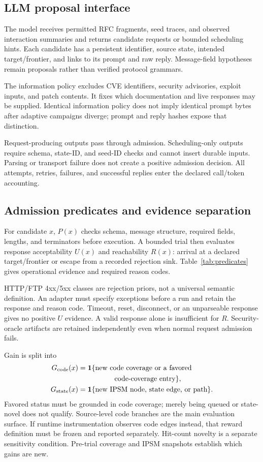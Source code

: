 \documentclass[final,5p,times,number]{elsarticle}
\newcommand{\gcode}{G_{\mathrm{code}}}
\newcommand{\gstate}{G_{\mathrm{state}}}
\begin{document}
\subsection{LLM proposal interface}
The model receives permitted RFC fragments, seed traces, and observed interaction summaries and returns candidate requests or bounded scheduling hints. Each candidate has a persistent identifier, source state, intended target/frontier, and links to its prompt and raw reply. Message-field hypotheses remain proposals rather than verified protocol grammars.

The information policy excludes CVE identifiers, security advisories, exploit inputs, and patch contents. It fixes which documentation and live responses may be supplied. Identical information policy does not imply identical prompt bytes after adaptive campaigns diverge; prompt and reply hashes expose that distinction.

Request-producing outputs pass through admission. Scheduling-only outputs require schema, state-ID, and seed-ID checks and cannot insert durable inputs. Parsing or transport failure does not create a positive admission decision. All attempts, retries, failures, and successful replies enter the declared call/token accounting.

\subsection{Admission predicates and evidence separation}
For candidate $x$, $P(x)$ checks schema, message structure, required fields, lengths, and terminators before execution. A bounded trial then evaluates response acceptability $U(x)$ and reachability $R(x)$: arrival at a declared target/frontier or escape from a recorded rejection sink. Table~\ref{tab:predicates} gives operational evidence and required reason codes.

HTTP/FTP 4xx/5xx classes are rejection priors, not a universal semantic definition. An adapter must specify exceptions before a run and retain the response and reason code. Timeout, reset, disconnect, or an unparseable response gives no positive $U$ evidence. A valid response alone is insufficient for $R$. Security-oracle artifacts are retained independently even when normal request admission fails.

Gain is split into
\begin{align}
\gcode(x)&=\mathbf{1}\{\text{new code coverage or a favored}\nonumber\\
&\hspace{18mm}\text{code-coverage entry}\},\label{eq:gcode}\\
\gstate(x)&=\mathbf{1}\{\text{new IPSM node, state edge, or path}\}.\label{eq:gstate}
\end{align}
Favored status must be grounded in code coverage; merely being queued or state-novel does not qualify. Source-level code branches are the main evaluation surface. If runtime instrumentation observes code edges instead, that reward definition must be frozen and reported separately. Hit-count novelty is a separate sensitivity condition. Pre-trial coverage and IPSM snapshots establish which gains are new.
\end{document}
